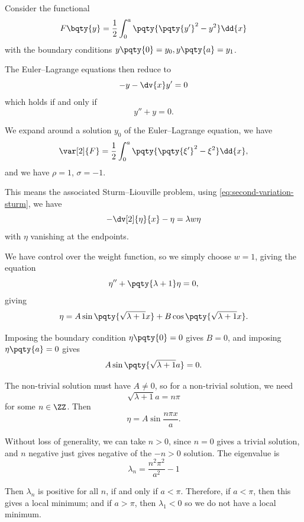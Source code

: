 \begin{example}
    \label{ex:sturm-liouville-application-second-variation}%
    Consider the functional
    \[
        F\bqty{y} = \frac{1}{2} \int_{0}^{a} \pqty{\pqty{y'}^2 - y^2} \dd{x}
    \]
    with the boundary conditions \(y\pqty{0} = y_0, y\pqty{a} = y_1\).

    The Euler--Lagrange equations then reduce to
    \[
        -y - \dv{x} y' = 0
    \]
    which holds if and only if
    \[
        y'' + y = 0.
    \]

    We expand around a solution \(y_0\) of the Euler--Lagrange equation, we have
    \[
        \var[2]{F} = \frac{1}{2} \int_{0}^{a} \pqty{\pqty{\xi '}^2 - \xi^2} \dd{x},
    \]
    and we have \(\rho = 1\), \(\sigma = -1\).

    This means the associated Sturm--Liouville problem, using \eqref{eq:second-variation-sturm}, we have
    \[
        - \dv[2]{\eta}{x} - \eta = \lambda w \eta
    \]
    with \(\eta\) vanishing at the endpoints.

    We have control over the weight function, so we simply choose \(w = 1\), giving the equation
    \[
        \eta '' + \pqty{\lambda + 1} \eta = 0,
    \]
    giving
    \[
        \eta = A \sin \pqty{\sqrt{\lambda + 1} x} + B \cos \pqty{\sqrt{\lambda + 1} x}.
    \]

    Imposing the boundary condition \(\eta\pqty{0} = 0\) gives \(B = 0\), and imposing \(\eta\pqty{a} = 0\) gives
    \[
        A \sin \pqty{\sqrt{\lambda + 1} a} = 0.
    \]

    The non-trivial solution must have \(A \neq 0\), so for a non-trivial solution, we need
    \[
        \sqrt{\lambda + 1} a = n \pi
    \]
    for some \(n \in \ZZ\). Then
    \[
        \eta = A \sin \frac{n \pi x}{a}.
    \]

    Without loss of generality, we can take \(n > 0\), since \(n = 0\) gives a trivial solution, and \(n\) negative just gives negative of the \(-n > 0\) solution. The eigenvalue is
    \[
        \lambda_n = \frac{n^2 \pi^2}{a^2} - 1
    \]

    Then \(\lambda_n\) is positive for all \(n\), if and only if \(a < \pi\). Therefore, if \(a < \pi\), then this gives a local minimum; and if \(a > \pi\), then \(\lambda_1 < 0\) so we do not have a local minimum.
\end{example}